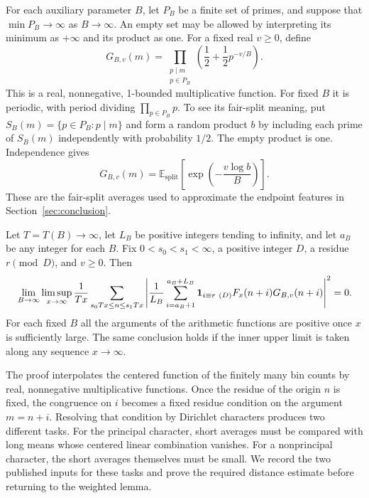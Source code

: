 For each auxiliary parameter $B$, let $P_B$ be a finite set of primes,
and suppose that $\min P_B\to\infty$ as $B\to\infty$.  An empty set
may be allowed by interpreting its minimum as $+\infty$ and its
product as one.  For a fixed real
$v\geq0$, define
\begin{equation}\label{eq:labels-G}
 G_{B,v}(m)=\prod_{\substack{p\mid m\\p\in P_B}}
                   \left(\frac12+\frac12p^{-v/B}\right).
\end{equation}
This is a real, nonnegative, 1-bounded multiplicative function.  For
fixed $B$ it is periodic, with period dividing $\prod_{p\in P_B}p$.
To see its fair-split meaning, put
$S_B(m)=\{p\in P_B:p\mid m\}$ and form a random product $b$ by
including each prime of $S_B(m)$ independently with probability $1/2$.
The empty product is one.  Independence gives
\[
 G_{B,v}(m)
 =\mathbb E_{\mathrm{split}}\!\left[\exp\!\left(-\frac{v\log b}{B}\right)\right].
\]
These are the fair-split averages used to approximate the endpoint
features in Section~\ref{sec:conclusion}.

\begin{lemma}
\label{lem:labels-short}
Let $T=T(B)\to\infty$, let $L_B$ be positive integers tending to
infinity, and let $a_B$ be any integer for each $B$.  Fix
$0<s_0<s_1<\infty$, a positive integer $D$, a residue $r\pmod D$,
and $v\geq0$.  Then
\begin{equation}\label{eq:labels-short}
 \lim_{B\to\infty}\limsup_{x\to\infty}
 \frac1{Tx}\sum_{s_0Tx\leq n\leq s_1Tx}
 \left|
   \frac1{L_B}\sum_{i=a_B+1}^{a_B+L_B}
     \mathbf 1_{i\equiv r\ (D)}F_x(n+i)G_{B,v}(n+i)
 \right|^2=0.
\end{equation}
For each fixed $B$ all the arguments of the arithmetic functions are
positive once $x$ is sufficiently large.  The same conclusion holds
if the inner upper limit is taken along any sequence $x\to\infty$.
\end{lemma}

The proof interpolates the centered function of the finitely many bin
counts by real, nonnegative multiplicative functions.  Once the residue of
the origin $n$ is fixed, the congruence on $i$ becomes a fixed residue
condition on the argument $m=n+i$.  Resolving that condition by Dirichlet
characters produces two different tasks.
For the principal character, short averages must be compared with long
means whose centered linear combination vanishes.  For a nonprincipal
character, the short averages themselves must be small.  We record the two
published inputs for these tasks and prove the required distance estimate
before returning to the weighted lemma.

